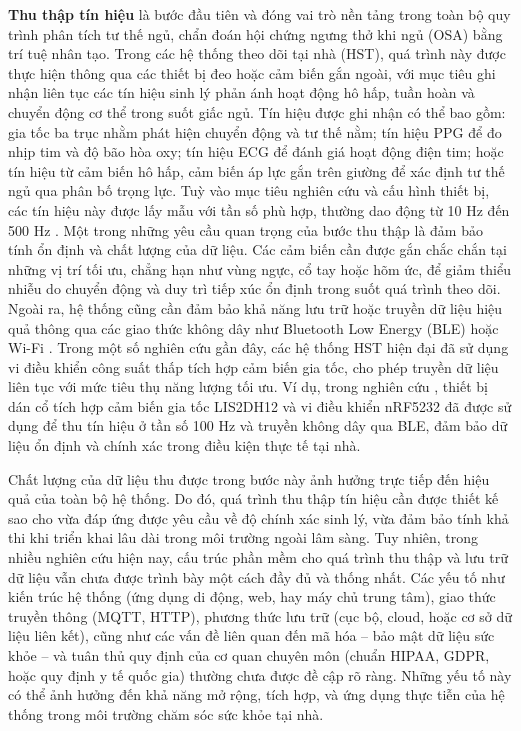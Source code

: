 \textbf{Thu thập tín hiệu} là bước đầu tiên và đóng vai trò nền tảng
trong toàn bộ quy trình phân tích tư thế ngủ, chẩn đoán hội chứng ngưng
thở khi ngủ (OSA) bằng trí tuệ nhân tạo. Trong các hệ thống theo dõi tại
nhà (HST), quá trình này được thực hiện thông qua các thiết bị đeo hoặc
cảm biến gắn ngoài, với mục tiêu ghi nhận liên tục các tín hiệu sinh
lý phản ánh hoạt động hô hấp, tuần hoàn và chuyển động cơ thể trong
suốt giấc ngủ.
Tín hiệu được ghi nhận có thể bao gồm: gia tốc ba trục nhằm phát hiện
chuyển động và tư thế nằm; tín hiệu PPG để đo nhịp tim và độ bão hòa oxy;
tín hiệu ECG để đánh giá hoạt động điện tim; hoặc tín hiệu từ cảm biến hô
hấp, cảm biến áp lực gắn trên giường để xác định tư thế ngủ qua phân
bố trọng lực. Tuỳ vào mục tiêu nghiên cứu và cấu hình thiết bị, các tín
hiệu này được lấy mẫu với tần số phù hợp, thường dao động từ 10 Hz đến
500 Hz \cite{Sleep_Posture_Detection, Jeng, Zhang_osa, Ferrer_osa, Sang, osa_sanchez2025}.
Một trong những yêu cầu quan trọng của bước thu thập là đảm bảo tính
ổn định và chất lượng của dữ liệu. Các cảm biến cần được gắn chắc chắn
tại những vị trí tối ưu, chẳng hạn như vùng ngực, cổ tay hoặc hõm ức,
để giảm thiểu nhiễu do chuyển động và duy trì tiếp xúc ổn định trong
suốt quá trình theo dõi. Ngoài ra, hệ thống cũng cần đảm bảo khả năng
lưu trữ hoặc truyền dữ liệu hiệu quả thông qua các giao thức không dây
như Bluetooth Low Energy (BLE) hoặc Wi-Fi \cite{thuong_wear_paper, hst_wear_paper}.
Trong một số nghiên cứu gần đây, các hệ thống HST hiện đại đã sử dụng
vi điều khiển công suất thấp tích hợp cảm biến gia tốc, cho phép truyền
dữ liệu liên tục với mức tiêu thụ năng lượng tối ưu. Ví dụ, trong nghiên
cứu \cite{Sleep_Posture_Detection}, thiết bị dán cổ tích hợp cảm biến gia
tốc LIS2DH12 và vi điều khiển nRF5232 đã được sử dụng để thu tín hiệu ở
tần số 100 Hz và truyền không dây qua BLE, đảm bảo dữ liệu ổn định và
chính xác trong điều kiện thực tế tại nhà.

Chất lượng của dữ liệu thu được trong bước này ảnh hưởng trực tiếp đến hiệu quả
của toàn bộ hệ thống. Do đó, quá trình thu thập tín hiệu cần được thiết kế sao
cho vừa đáp ứng được yêu cầu về độ chính xác sinh lý, vừa đảm bảo tính khả thi
khi triển khai lâu dài trong môi trường ngoài lâm sàng. Tuy nhiên, trong nhiều
nghiên cứu hiện nay, cấu trúc phần mềm cho quá trình thu thập và lưu trữ dữ
liệu vẫn chưa được trình bày một cách đầy đủ và thống nhất. Các yếu tố như kiến
trúc hệ thống (ứng dụng di động, web, hay máy chủ trung tâm), giao thức truyền
thông (MQTT, HTTP), phương thức lưu trữ (cục bộ, cloud, hoặc cơ sở dữ liệu liên
kết), cũng như các vấn đề liên quan đến mã hóa – bảo mật dữ liệu sức khỏe – và
tuân thủ quy định của cơ quan chuyên môn (chuẩn HIPAA, GDPR, hoặc quy định y tế
quốc gia) thường chưa được đề cập rõ ràng. Những yếu tố này có thể ảnh hưởng
đến khả năng mở rộng, tích hợp, và ứng dụng thực tiễn của hệ thống trong môi
trường chăm sóc sức khỏe tại nhà.

